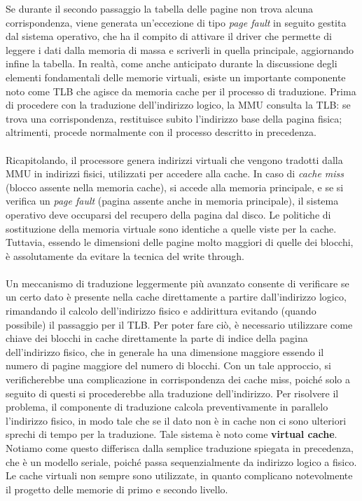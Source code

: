 Se durante il secondo passaggio la tabella delle pagine non trova alcuna corrispondenza, viene generata un'eccezione di tipo \textit{page fault} in seguito gestita dal sistema operativo, che ha il compito di attivare il driver che permette di leggere i dati dalla memoria di massa e scriverli in quella principale, aggiornando infine la tabella. In realtà, come anche anticipato durante la discussione degli elementi fondamentali delle memorie virtuali, esiste un importante componente noto come TLB che agisce da memoria cache per il processo di traduzione. Prima di procedere con la traduzione dell'indirizzo logico, la MMU consulta la TLB: se trova una corrispondenza, restituisce subito l'indirizzo base della pagina fisica; altrimenti, procede normalmente con il processo descritto in precedenza.
\\
\\
Ricapitolando, il processore genera indirizzi virtuali che vengono tradotti dalla MMU in indirizzi fisici, utilizzati per accedere alla cache. In caso di \textit{cache miss} (blocco assente nella memoria cache), si accede alla memoria principale, e se si verifica un \textit{page fault} (pagina assente anche in memoria principale), il sistema operativo deve occuparsi del recupero della pagina dal disco. Le politiche di sostituzione della memoria virtuale sono identiche a quelle viste per la cache. Tuttavia, essendo le dimensioni delle pagine molto maggiori di quelle dei blocchi, è assolutamente da evitare la tecnica del write through.
\\
\\
Un meccanismo di traduzione leggermente più avanzato consente di verificare se un certo dato è presente nella cache direttamente a partire dall'indirizzo logico, rimandando il calcolo dell'indirizzo fisico e addirittura evitando (quando possibile) il passaggio per il TLB. Per poter fare ciò, è necessario utilizzare come chiave dei blocchi in cache direttamente la parte di indice della pagina dell'indirizzo fisico, che in generale ha una dimensione maggiore essendo il numero di pagine maggiore del numero di blocchi. Con un tale approccio, si verificherebbe una complicazione in corrispondenza dei cache miss, poiché solo a seguito di questi si procederebbe alla traduzione dell'indirizzo. Per risolvere il problema, il componente di traduzione calcola preventivamente in parallelo l'indirizzo fisico, in modo tale che se il dato non è in cache non ci sono ulteriori sprechi di tempo per la traduzione. Tale sistema è noto come \textbf{virtual cache}. Notiamo come questo differisca dalla semplice traduzione spiegata in precedenza, che è un modello seriale, poiché passa sequenzialmente da indirizzo logico a fisico. Le cache virtuali non sempre sono utilizzate, in quanto complicano notevolmente il progetto delle memorie di primo e secondo livello.
